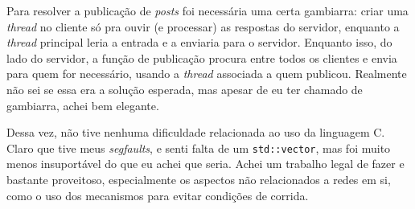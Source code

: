 \documentclass[12pt]{article}
\begin{document}
Para resolver a publicação de \textit{posts} foi necessária uma certa gambiarra: criar uma \textit{thread} no cliente só pra ouvir (e processar) as respostas do servidor, enquanto a \textit{thread} principal leria a entrada e a enviaria para o servidor. Enquanto isso, do lado do servidor, a função de publicação procura entre todos os clientes e envia para quem for necessário, usando a \textit{thread} associada a quem publicou. Realmente não sei se essa era a solução esperada, mas apesar de eu ter chamado de gambiarra, achei bem elegante.

Dessa vez, não tive nenhuma dificuldade relacionada ao uso da linguagem C. Claro que tive meus \textit{segfaults}, e senti falta de um \texttt{std::vector}, mas foi muito menos insuportável do que eu achei que seria. Achei um trabalho legal de fazer e bastante proveitoso, especialmente os aspectos não relacionados a redes em si, como o uso dos mecanismos para evitar condições de corrida.
\end{document}
